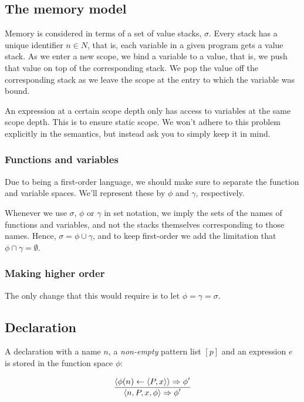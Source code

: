 \subsection{The memory model}\label{section:d-semantics-memory}

Memory is considered in terms of a set of value stacks, $\sigma$. Every stack
has a unique identifier $n\in N$, that is, each variable in a given program
gets a value stack. As we enter a new scope, we bind a variable to a value,
that is, we push that value on top of the corresponding stack. We pop the value
off the corresponding stack as we leave the scope at the entry to which the
variable was bound.

An expression at a certain scope depth only has access to variables at the same
scope depth. This is to ensure static scope. We won't adhere to this problem
explicitly in the semantics, but instead ask you to simply keep it in mind.

\subsubsection{Functions and variables}

Due to \D{} being a first-order language, we should make sure to separate the
function and variable spaces. We'll represent these by $\phi$ and $\gamma$,
respectively.

Whenever we use $\sigma$, $\phi$ or $\gamma$ in set notation, we imply the sets
of the names of functions and variables, and not the stacks themselves
corresponding to those names.  Hence, $\sigma=\phi\cup\gamma$, and to keep \D{}
first-order we add the limitation that $\phi\cap\gamma=\emptyset$.

\subsubsection{Making \D{} higher order}

The only change that this would require is to let $\phi=\gamma=\sigma$.

\subsection{Declaration}

A declaration with a name $n$, a \emph{non-empty} pattern
list $[p]$ and an expression $e$ is stored in the function space $\phi$:

\begin{equation}\label{sem:declaration}
{\displaystyle
  \left\langle \phi(n)\leftarrow \left\langle P, x\right\rangle\right\rangle
  \Rightarrow
  \phi'
\over\displaystyle
  \left\langle n, P, x, \phi\right\rangle
  \Rightarrow
  \phi'
}
\end{equation}

